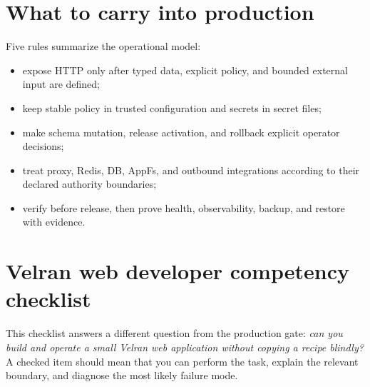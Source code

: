 \section{What to carry into production}

Five rules summarize the operational model:

\begin{itemize}
  \item expose HTTP only after typed data, explicit policy, and bounded external input are defined;
  \item keep stable policy in trusted configuration and secrets in secret files;
  \item make schema mutation, release activation, and rollback explicit operator decisions;
  \item treat proxy, Redis, DB, AppFs, and outbound integrations according to their declared authority boundaries;
  \item verify before release, then prove health, observability, backup, and restore with evidence.
\end{itemize}

\section{Velran web developer competency checklist}

This checklist answers a different question from the production gate: \emph{can you build and operate a small Velran web application without copying a recipe blindly?} A checked item should mean that you can perform the task, explain the relevant boundary, and diagnose the most likely failure mode.

